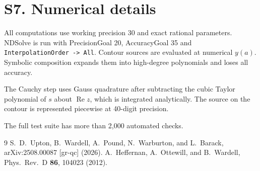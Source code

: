 \documentclass[aps,prl,onecolumn,superscriptaddress,nofootinbib,floatfix]{revtex4-2}
\renewcommand{\Re}{\operatorname{Re}}
\begin{document}
\section{S7. Numerical details}
All computations use working precision 30 and exact rational parameters.
NDSolve is run with PrecisionGoal 20, AccuracyGoal 35 and \texttt{InterpolationOrder -> All}.
Contour sources are evaluated at numerical $y(a)$. Symbolic composition expands them into high-degree polynomials and loses all accuracy.

The Cauchy step uses Gauss quadrature after subtracting the cubic Taylor polynomial of $s$ about $\Re z$, which is integrated analytically. The source on the contour is represented piecewise at 40-digit precision.

The full test suite has more than 2,000 automated checks.

\begin{thebibliography}{9}
S.~D.~Upton, B.~Wardell, A.~Pound, N.~Warburton, and L.~Barack, arXiv:2508.00087 [gr-qc] (2026).
A.~Heffernan, A.~Ottewill, and B.~Wardell, Phys.\ Rev.\ D \textbf{86}, 104023 (2012).
\end{thebibliography}
\end{document}

